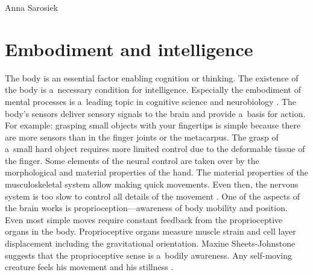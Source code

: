 \begin{artengenv}{Anna Sarosiek}
\section*{Embodiment and intelligence}
The body is an essential factor enabling cognition or thinking. The existence of the body is a~necessary condition for intelligence. Especially the embodiment of mental processes is a~leading topic in cognitive science and neurobiology
\parencites[][]{clark_being_1997}[][]{damasio_descartes_1994}[][]{deely_basics_1990}[][]{lakoff_philosophy_1999}[][]{varela_embodied_1993}. %
 The body’s sensors deliver sensory signals to the brain and provide a~basis for action. For example: grasping small objects with your fingertips is simple because there are more sensors than in the finger joints or the metacarpus. The grasp of a~small hard object requires more limited control due to the deformable tissue of the finger. Some elements of the neural control are taken over by the morphological and material properties of the hand. The material properties of the musculoskeletal system allow making quick movements. Even then, the nervous system is too slow to control all details of the movement 
\parencites[][]{clark_being_1997}[][]{damasio_descartes_1994}[][]{deely_basics_1990}[][]{lakoff_philosophy_1999}[][]{varela_embodied_1993}. %
 One of the aspects of the brain works is proprioception---awareness of body mobility and position. Even most simple moves require constant feedback from the proprioceptive organs in the body. Proprioceptive organs measure muscle strain and cell layer displacement including the gravitational orientation. Maxine Sheets-Johnstone suggests that the proprioceptive sense is a~bodily awareness. Any self-moving creature feels his movement and his stillness 
\parencite[][]{sheets-johnstone_consciousness_1998}.%



\end{artengenv}
